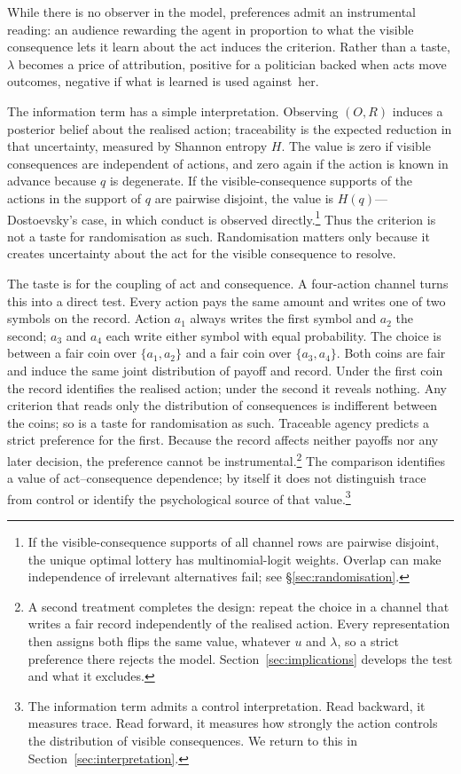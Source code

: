 \documentclass[11pt,a4paper]{article}
\theoremstyle{definition}
\newcommand{\Sh}{H}
\newcommand{\1}{\mathbf 1}
\begin{document}
While there is no observer in the model, preferences admit an instrumental reading: an audience rewarding the agent in proportion to what the visible consequence lets it learn about the act induces the criterion. Rather than a taste, $\lambda$ becomes a price of attribution, positive for a politician backed when acts move outcomes, negative if what is learned is used against~her.


The information term has a simple interpretation.  Observing $(O,R)$ induces a posterior belief about the realised
action; traceability is the expected reduction in that uncertainty, measured by Shannon entropy $\Sh$.  The value is
zero if visible consequences are independent of actions, and zero again if the action is known in advance
because $q$ is degenerate.  If the visible-consequence supports of the actions in the support of
$q$ are pairwise disjoint, the value is $\Sh(q)$---Dostoevsky's case, in which conduct is observed directly.\footnote{If the
visible-consequence supports of all channel rows are pairwise disjoint, the unique optimal lottery has
multinomial-logit weights.  Overlap can make independence of irrelevant alternatives fail; see
\S\ref{sec:randomisation}.}  Thus the criterion is
not a taste for randomisation as such.  Randomisation matters only because it creates uncertainty about the act for the
visible consequence to resolve.

The taste is for the coupling of act and consequence.  A
four-action channel turns this into a direct test.  Every action pays the same amount and writes one of two
symbols on the record.  Action $a_1$ always writes the first symbol and $a_2$ the second; $a_3$ and $a_4$ each
write either symbol with equal probability.  The choice is between a fair coin over $\{a_1,a_2\}$ and a fair
coin over $\{a_3,a_4\}$.  Both coins are fair and induce the same joint distribution of payoff
and record.  Under the first coin the record identifies the realised action; under the second it reveals
nothing.  Any criterion that reads only the distribution of consequences is indifferent between the coins; so is
a taste for randomisation as such.  Traceable agency predicts a strict preference for the first.  Because the
record affects neither payoffs nor any later decision, the preference cannot be
instrumental.\footnote{A second treatment completes the design: repeat
the choice in a channel that writes a fair record independently of the realised action.  Every representation
then assigns both flips the same value, whatever $u$ and $\lambda$, so a strict preference there rejects the
model.  Section~\ref{sec:implications} develops the test and what it excludes.}  The comparison identifies a
value of act--consequence dependence; by itself it does not distinguish trace from control or identify the
psychological source of that value.\footnote{The information term admits a control interpretation. Read backward, it measures trace. Read forward, it measures how strongly the action controls the distribution of visible consequences. We return to this in Section~\ref{sec:interpretation}.}
\end{document}
